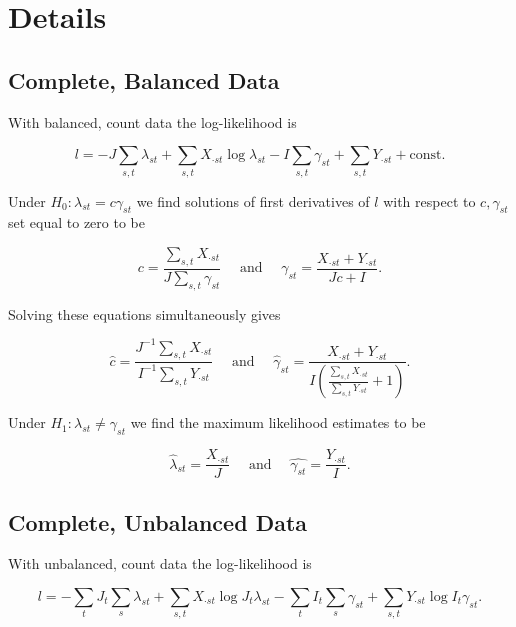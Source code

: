 \documentclass[12pt]{article}\usepackage[]{graphicx}\usepackage[]{color}
\begin{document}
\appendix
\section{Details}
\subsection{Complete, Balanced Data}
With balanced, count data the log-likelihood is

\begin{equation*}
  l = -J\sum_{s,t} \lambda_{st} + \sum_{s,t}X_{\cdot st}\log{\lambda_{st}} - I \sum_{s,t}\gamma_{st} + \sum_{s,t}Y_{\cdot st} + \text{const}.
\end{equation*}

Under $H_0: \lambda_{st} = c \gamma_{st}$ we find solutions of first derivatives of $l$ with respect to $c, \gamma_{st}$ set equal to zero to be

\begin{equation*}
  c = \frac{\sum_{s,t} X_{\cdot st}}{J\sum_{s,t} \gamma_{st}} \quad \text{ and } \quad \gamma_{st} = \frac{X_{\cdot st} + Y_{\cdot st}}{Jc + I}.
\end{equation*}

\noindent Solving these equations simultaneously gives

\begin{equation*}
  \hat{c} = \frac{J^{-1} \sum_{s,t} X_{\cdot st}}{I^{-1} \sum_{s,t} Y_{\cdot st}} \quad \text{ and } \quad \hat{\gamma}_{st} = \frac{X_{\cdot st} + Y_{\cdot st}}{I\left( \frac{\sum_{s,t}X_{\cdot st}}{\sum_{s,t} Y_{\cdot st}} + 1  \right)}.
\end{equation*}

Under $H_1: \lambda_{st} \ne \gamma_{st}$ we find the maximum likelihood estimates to be

\begin{equation*}
  \hat{\lambda}_{st} = \frac{X_{\cdot st}}{J} \quad \text{ and } \quad \hat{\gamma_{st}} = \frac{Y_{\cdot st}}{I}.
\end{equation*}

\subsection{Complete, Unbalanced Data}

With unbalanced, count data the log-likelihood is

\begin{equation*}
  l = -\sum_{t} J_t \sum_{s} \lambda_{st} + \sum_{s,t} X_{\cdot st} \log{J_t \lambda_{st}} - \sum_{t} I_t \sum_{s} \gamma_{st} + \sum_{s,t} Y_{\cdot st} \log{I_t \gamma_{st}}.
\end{equation*}
\end{document}

